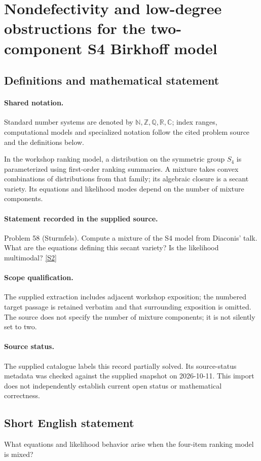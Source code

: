 \documentclass[11pt]{article}
\newcommand{\sref}[2]{\hyperlink{source:#1:#2}{[S#2]}}
\begin{document}
\section{Nondefectivity and low-degree obstructions for the two-component S4 Birkhoff model}\label{statement}

\subsection{Definitions and mathematical statement}

\paragraph{Shared notation.}Standard number systems are denoted by $\mathbb N,\mathbb Z,\mathbb Q,\mathbb R,\mathbb C$; index ranges, computational models and specialized notation follow the cited problem source and the definitions below.


In the workshop ranking model, a distribution on the symmetric group $S_4$ is parameterized using first-order ranking summaries. A mixture takes convex combinations of distributions from that family; its algebraic closure is a secant variety. Its equations and likelihood modes depend on the number of mixture components.
\paragraph{Statement recorded in the supplied source.}
Problem 58 (Sturmfels). Compute a mixture of the S4 model from Diaconis' talk. What are the equations defining this secant variety? Is the likelihood multimodal? \sref{statement}{2}
\paragraph{Scope qualification.}
The supplied extraction includes adjacent workshop exposition; the numbered target passage is retained verbatim and that surrounding exposition is omitted. The source does not specify the number of mixture components; it is not silently set to two.
\paragraph{Source status.}
The supplied catalogue labels this record partially solved. Its source-status metadata was checked against the supplied snapshot on 2026-10-11. This import does not independently establish current open status or mathematical correctness.
\subsection{Short English statement}
What equations and likelihood behavior arise when the four-item ranking model is mixed?
\end{document}

